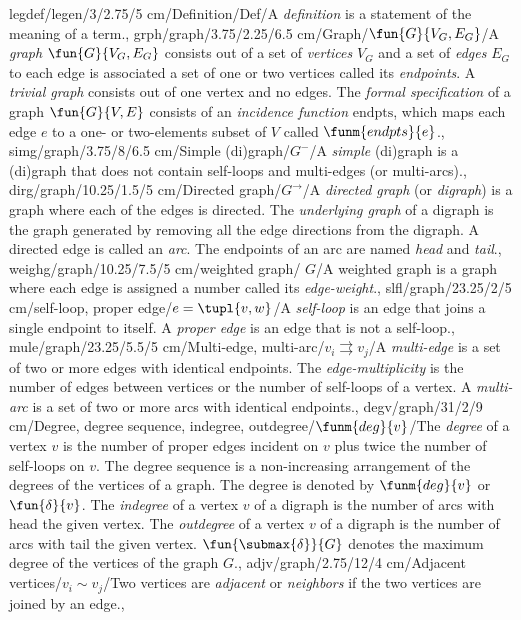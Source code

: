 legdef/legen/3/2.75/5 cm/Definition/Def/{A \emph{definition} is a statement of the meaning of a term.},%
grph/graph/3.75/2.25/6.5 cm/Graph/{$\fun{G}{V_G,E_G}$}/{A \emph{graph} $\fun{G}{V_G,E_G}$ consists out of a set of \emph{vertices} $V_G$ and a set of \emph{edges} $E_G$ to each edge is associated a set of one or two vertices called its \emph{endpoints}. A \emph{trivial graph} consists out of one vertex and no edges. The \emph{formal specification} of a graph $\fun{G}{V,E}$ consists of an \emph{incidence function} $\mbox{endpts}$, which maps each edge $e$ to a one- or two-elements subset of $V$ called $\funm{endpts}{e}$.},
simg/graph/3.75/8/6.5 cm/{Simple (di)graph}/$G^{-}$/{A \emph{simple} (di)graph is a (di)graph that does not contain self-loops and multi-edges (or multi-arcs).},
dirg/graph/10.25/1.5/5 cm/{Directed graph}/$G^{\rightarrow}$/{A \emph{directed graph} (or \emph{digraph}) is a graph where each of the edges is directed. The \emph{underlying graph} of a digraph is the graph generated by removing all the edge directions from the digraph. A directed edge is called an \emph{arc}. The endpoints of an arc are named \emph{head} and \emph{tail}.},
weighg/graph/10.25/7.5/5 cm/{weighted graph}/{\textlinb{\BPtalent} $G$}/{A weighted graph is a graph where each edge is assigned a number called its \emph{edge-weight}.},
slfl/graph/23.25/2/5 cm/{self-loop, proper edge}/{$e=\tupl{v,w}$}/{A \emph{self-loop} is an edge that joins a single endpoint to itself. A \emph{proper edge} is an edge that is not a self-loop.},
mule/graph/23.25/5.5/5 cm/{Multi-edge, multi-arc}/$v_i\rightrightarrows v_j$/{A \emph{multi-edge} is a set of two or more edges with identical endpoints. The \emph{edge-multiplicity} is the number of edges between vertices or the number of self-loops of a vertex. A \emph{multi-arc} is a set of two or more arcs with identical endpoints.},
degv/graph/31/2/9 cm/{Degree, degree sequence, indegree, outdegree}/{$\funm{deg}{v}$}/{The \emph{degree} of a vertex $v$ is the number of proper edges incident on $v$ plus twice the number of self-loops on $v$. The degree sequence is a non-increasing arrangement of the degrees of the vertices of a graph. The degree is denoted by $\funm{deg}{v}$ or $\fun{\delta}{v}$. The \emph{indegree} of a vertex $v$ of a digraph is the number of arcs with head the given vertex. The \emph{outdegree} of a vertex $v$ of a digraph is the number of arcs with tail the given vertex. $\fun{\submax{\delta}}{G}$ denotes the maximum degree of the vertices of the graph $G$.},
adjv/graph/2.75/12/4 cm/{Adjacent vertices}/{$v_i\sim v_j$}/{Two vertices are \emph{adjacent} or \emph{neighbors} if the two vertices are joined by an edge.},
